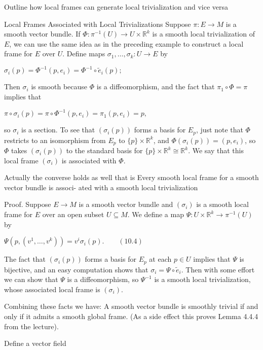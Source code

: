 Outline how local frames can generate local trivialization and vice versa

Local Frames Associated with Local Trivializations
Suppose \(\pi: E \to M\) is a smooth vector bundle. 
If \(\Phi: \pi^{-1}(U) \to U \times \mathbb{R}^k\) is a smooth local trivialization of \(E\), 
we can use the same idea as in the preceding example to construct a local frame for \(E\) over \(U\). 
Define maps \(\sigma_1, \dots, \sigma_k: U \to E\) by 

\(\sigma_i(p) = \Phi^{-1}(p, e_i) = \Phi^{-1} \circ \tilde{e}_i (p);\)

Then \(\sigma_i\) is smooth because \(\Phi\) is a diffeomorphism, 
and the fact that \(\pi_1 \circ \Phi = \pi\) implies that

\(\pi \circ \sigma_i(p) = \pi \circ \Phi^{-1}(p, e_i) = \pi_1(p, e_i) = p,\)

so \(\sigma_i\) is a section. 
To see that \((\sigma_i(p))\) forms a basis for \(E_p\), just note that \(\Phi\) restricts to an isomorphism from 
\(E_p\) to \(\{p\} \times \mathbb{R}^k\), and \(\Phi(\sigma_i(p)) = (p, e_i)\), so \(\Phi\) takes \((\sigma_i(p))\) 
to the standard basis for \(\{p\} \times \mathbb{R}^k \cong \mathbb{R}^k\). 
We say that this local frame \((\sigma_i)\) is associated with \(\Phi\).

Actually the converse holds as well that is
Every smooth local frame for a smooth vector bundle is associ-
ated with a smooth local trivialization

Proof. 
Suppose \(E \to M\) is a smooth vector bundle and \((\sigma_i)\) is a smooth local frame 
for \(E\) over an open subset \(U \subseteq M\). 
We define a map \(\Psi: U \times \mathbb{R}^k \to \pi^{-1}(U)\) by

\(\Psi(p, (v^1, \dots, v^k)) = v^i \sigma_i(p). \qquad (10.4)\)

The fact that \((\sigma_i(p))\) forms a basis for \(E_p\) at each \(p \in U\) implies that \(\Psi\) is bijective, 
and an easy computation shows that \(\sigma_i = \Psi \circ \tilde{e}_i\). 
Then with some effort we can show that \(\Psi\) is a diffeomorphism, so \(\Psi^{-1}\) is a smooth local trivialization, 
whose associated local frame is \((\sigma_i)\).

Combining these facts we have:
A smooth vector bundle is smoothly trivial if and only if it admits a smooth global frame.
(As a side effect this proves Lemma 4.4.4 from the lecture).


Define a vector field

